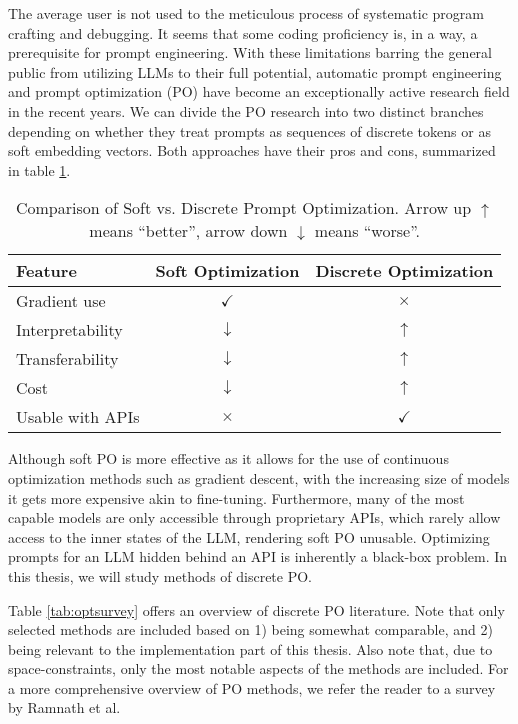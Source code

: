 The average user is not used to the meticulous process of systematic program crafting and debugging. It seems that
some coding proficiency is, in a way, a prerequisite for prompt engineering. With these limitations barring the general public from utilizing LLMs to their full potential,
automatic prompt engineering and prompt optimization (PO) have become an exceptionally active research field in the recent years.
\newpage
We can divide the PO research into two distinct branches depending on whether 
they treat prompts as sequences of discrete tokens or as soft embedding vectors. 
Both approaches have their pros and cons, summarized in table \ref{tab:disxcont}.
\begin{table}[htbp]
    \centering
    \caption{Comparison of Soft vs. Discrete Prompt Optimization. Arrow up $\uparrow$ means ``better'', arrow down $\downarrow$ means ``worse''.}\label{tab:disxcont}
    \begin{tabular}{lcc}
    \toprule
    \textbf{Feature} & \textbf{Soft Optimization} & \textbf{Discrete Optimization} \\
    \midrule
    Gradient use      & $\checkmark$   & $\times$ \\
    Interpretability  & $\downarrow$ & $\uparrow$ \\
    Transferability  & $\downarrow$ & $\uparrow$ \\
    Cost  & $\downarrow$ & $\uparrow$ \\
    Usable with APIs  & $\times$   & $\checkmark$ \\
    \bottomrule
    \end{tabular}
    \end{table}

Although soft PO is more effective as it allows for the use of 
continuous optimization methods such as gradient descent, with the increasing size of models
it gets more expensive akin to fine-tuning. Furthermore, many of the most capable models are 
only accessible through proprietary APIs, which rarely allow access to the inner states of the LLM,
rendering soft PO unusable.
Optimizing prompts for an LLM hidden behind an API is inherently a black-box problem. 
In this thesis, we will study methods of discrete PO.

Table \ref{tab:optsurvey} offers an overview of discrete PO literature. Note that only selected methods are included 
based on 1) being somewhat comparable, and 2) being relevant to the implementation part of this thesis.
Also note that, due to space-constraints, only the most notable aspects of the methods are included. 
For a more comprehensive overview of PO methods, we refer the reader to a survey\cite{ramnath2025systematicsurveyautomaticprompt} by Ramnath et al.

